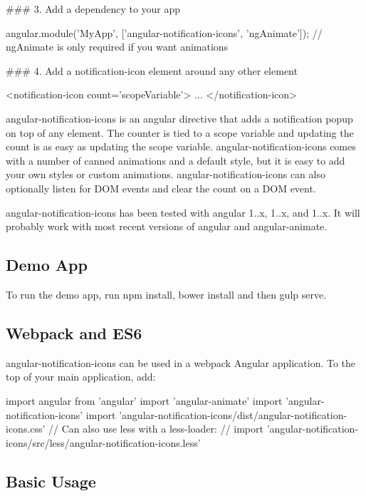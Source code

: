 \#\#\# 3. Add a dependency to your app 
\begin{DoxyCode}
angular.module('MyApp', ['angular-notification-icons', 'ngAnimate']); // ngAnimate is only required if you
       want animations
\end{DoxyCode}


\#\#\# 4. Add a notification-\/icon element around any other element 
\begin{DoxyCode}
<notification-icon count='scopeVariable'>
  ...
</notification-icon>
\end{DoxyCode}


angular-\/notification-\/icons is an angular directive that adds a notification popup on top of any element. The counter is tied to a scope variable and updating the count is as easy as updating the scope variable. angular-\/notification-\/icons comes with a number of canned animations and a default style, but it is easy to add your own styles or custom animations. angular-\/notification-\/icons can also optionally listen for D\+OM events and clear the count on a D\+OM event.

angular-\/notification-\/icons has been tested with angular 1..\+x, 1..\+x, and 1..\+x. It will probably work with most recent versions of angular and angular-\/animate.

\subsection*{Demo App}

To run the demo app, run {\ttfamily npm install}, {\ttfamily bower install} and then {\ttfamily gulp serve}.

\subsection*{Webpack and E\+S6}

angular-\/notification-\/icons can be used in a webpack Angular application. To the top of your main application, add\+: 
\begin{DoxyCode}
import angular from 'angular'
import 'angular-animate'
import 'angular-notification-icons'
import 'angular-notification-icons/dist/angular-notification-icons.css'
// Can also use less with a less-loader:
// import 'angular-notification-icons/src/less/angular-notification-icons.less'
\end{DoxyCode}


\subsection*{Basic Usage}

